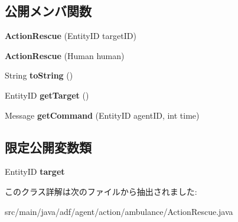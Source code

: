 \subsection*{公開メンバ関数}
\begin{DoxyCompactItemize}
\item 
\hypertarget{classadf_1_1agent_1_1action_1_1ambulance_1_1ActionRescue_a775f329369155fafbacbfe011205a028}{}\label{classadf_1_1agent_1_1action_1_1ambulance_1_1ActionRescue_a775f329369155fafbacbfe011205a028} 
{\bfseries Action\+Rescue} (Entity\+ID target\+ID)
\item 
\hypertarget{classadf_1_1agent_1_1action_1_1ambulance_1_1ActionRescue_a31dc4b96abd6a526b0942971814efb75}{}\label{classadf_1_1agent_1_1action_1_1ambulance_1_1ActionRescue_a31dc4b96abd6a526b0942971814efb75} 
{\bfseries Action\+Rescue} (Human human)
\item 
\hypertarget{classadf_1_1agent_1_1action_1_1ambulance_1_1ActionRescue_a5543738527ed1ac96dee4c3248c9edca}{}\label{classadf_1_1agent_1_1action_1_1ambulance_1_1ActionRescue_a5543738527ed1ac96dee4c3248c9edca} 
String {\bfseries to\+String} ()
\item 
\hypertarget{classadf_1_1agent_1_1action_1_1ambulance_1_1ActionRescue_a526187da7c7b537cd8ec6f297b3a66e0}{}\label{classadf_1_1agent_1_1action_1_1ambulance_1_1ActionRescue_a526187da7c7b537cd8ec6f297b3a66e0} 
Entity\+ID {\bfseries get\+Target} ()
\item 
\hypertarget{classadf_1_1agent_1_1action_1_1ambulance_1_1ActionRescue_a74d4a3b6d9a649e96ec40cf323d1e416}{}\label{classadf_1_1agent_1_1action_1_1ambulance_1_1ActionRescue_a74d4a3b6d9a649e96ec40cf323d1e416} 
Message {\bfseries get\+Command} (Entity\+ID agent\+ID, int time)
\end{DoxyCompactItemize}
\subsection*{限定公開変数類}
\begin{DoxyCompactItemize}
\item 
\hypertarget{classadf_1_1agent_1_1action_1_1ambulance_1_1ActionRescue_a4280350fbfd1d62e5bc45affcebfe701}{}\label{classadf_1_1agent_1_1action_1_1ambulance_1_1ActionRescue_a4280350fbfd1d62e5bc45affcebfe701} 
Entity\+ID {\bfseries target}
\end{DoxyCompactItemize}


このクラス詳解は次のファイルから抽出されました\+:\begin{DoxyCompactItemize}
\item 
src/main/java/adf/agent/action/ambulance/Action\+Rescue.\+java\end{DoxyCompactItemize}
